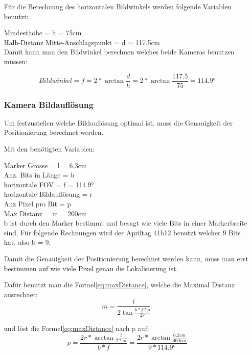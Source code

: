 Für die Berechnung des horizontalen Bildwinkels werden folgende Variablen benutzt:

Mindesthöhe = h = 75cm\\
Halb-Distanz Mitte-Anschlagspunkt = d = 117.5cm\\

Damit kann man den Bildwinkel berechnen welches beide Kameras benutzen müssen:

\begin{equation}
    Bildwinkel = f = 2*\arctan\frac{d}{h} = 2*\arctan\frac{117.5}{75} = 114.9°
    \label{eq:FOV}
\end{equation}


\subsubsection{Kamera Bildauflösung}
Um festzustellen welche Bildauflösung optimal ist, muss die Genauigkeit der Positionierung berechnet werden.

Mit den benötigten Variablen:

 Marker Grösse = l = 6.3cm\\
 Anz. Bits in Länge = b\\
 horizontale FOV = f = 114.9°\\
 horizontale Bildauflösung = r\\
 Anz Pixel pro Bit = p\\
 Max Distanz = m = 200cm\\

b ist durch den Marker bestimmt und besagt wie viele Bits in einer Markerbreite sind. 
Für folgende Rechnungen wird der Apriltag 41h12 benutzt welcher 9 Bits hat, also b = 9.

Damit die Genauigkeit der Positionierung berechnet werden kann, muss man erst bestimmen auf wie viele Pixel genau die Lokalisierung ist.

Dafür benutzt man die Formel\ref{eq:maxDistance}, welche die Maximal Distanz ausrechnet\cite{noauthor_designing_2020}:
\begin{equation}
m = \frac{t}{2\tan\frac{b*f*p}{2r}}.
\label{eq:maxDistance}
\end{equation}

und löst die Formel\ref{eq:maxDistance} nach p auf:
\begin{equation}
p = \frac{2r*\arctan\frac{t}{2*m}}{b*f} = \frac{2r*\arctan\frac{6.3cm}{400cm}}{9*114.9°}
\label{eq:PixelperBits}
\end{equation}

